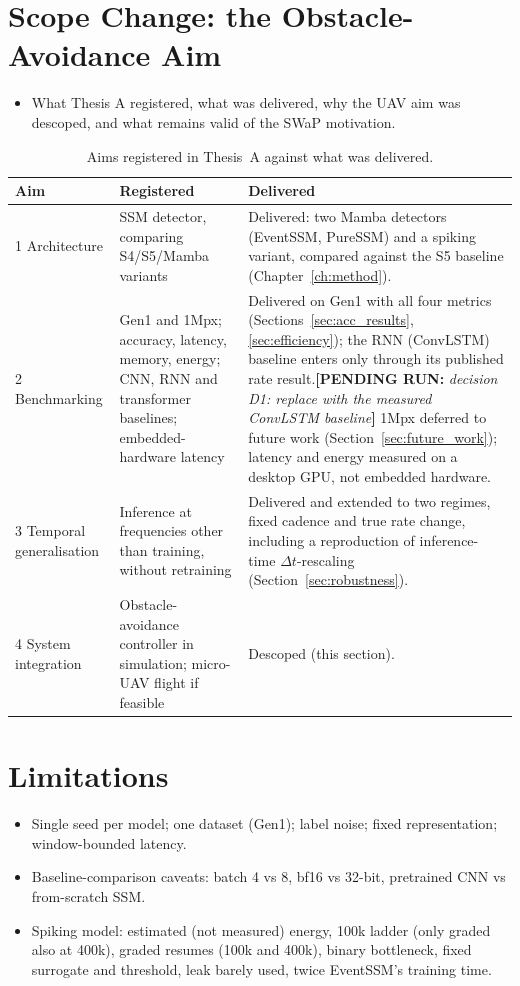 \documentclass[11pt, a4paper]{report}
\newif\iftbdshow \tbdshowtrue
\newcommand{\needsgpu}[1]{\iftbdshow{\color{orange!80!black}\small\textbf{[PENDING RUN: }\textit{#1}\textbf{]}}\fi}
\begin{document}
\section{Scope Change: the Obstacle-Avoidance Aim}
\label{sec:scope_change}
\begin{itemize}
  \item What Thesis A registered, what was delivered, why the UAV aim was descoped, and what remains valid of the SWaP motivation.
\end{itemize}
\begin{table}[htbp]
\centering
\small
\caption{Aims registered in Thesis~A against what was delivered.}
\label{tab:aims}
\begin{tabularx}{\textwidth}{@{}l>{\raggedright\arraybackslash}X>{\raggedright\arraybackslash}X@{}}
\toprule
\textbf{Aim} & \textbf{Registered} & \textbf{Delivered} \\
\midrule
1 Architecture & SSM detector, comparing S4/S5/Mamba variants &
  Delivered: two Mamba detectors (EventSSM, PureSSM) and a spiking variant, compared against the S5
  baseline (Chapter~\ref{ch:method}). \\
2 Benchmarking & Gen1 and 1Mpx; accuracy, latency, memory, energy; CNN, RNN and transformer baselines;
  embedded-hardware latency &
  Delivered on Gen1 with all four metrics (Sections~\ref{sec:acc_results}, \ref{sec:efficiency}); the
  RNN (ConvLSTM) baseline enters only through its published rate result.\needsgpu{decision D1: replace with
  the measured ConvLSTM baseline}
  1Mpx deferred to future work (Section~\ref{sec:future_work}); latency and energy measured on a
  desktop GPU, not embedded hardware. \\
3 Temporal generalisation & Inference at frequencies other than training, without retraining &
  Delivered and extended to two regimes, fixed cadence and true rate change, including a reproduction
  of inference-time $\Delta t$-rescaling (Section~\ref{sec:robustness}). \\
4 System integration & Obstacle-avoidance controller in simulation; micro-UAV flight if feasible &
  Descoped (this section). \\
\bottomrule
\end{tabularx}
\end{table}

\section{Limitations}
\label{sec:limitations}
\begin{itemize}
  \item Single seed per model; one dataset (Gen1); label noise; fixed representation; window-bounded latency.
  \item Baseline-comparison caveats: batch 4 vs 8, bf16 vs 32-bit, pretrained CNN vs from-scratch SSM.
  \item Spiking model: estimated (not measured) energy, 100k ladder (only graded also at 400k), graded resumes (100k and 400k), binary bottleneck, fixed surrogate and threshold, leak barely used, twice EventSSM's training time.
\end{itemize}
\end{document}
